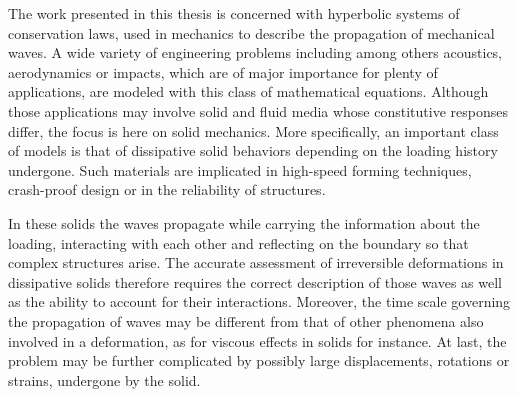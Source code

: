 The work presented in this thesis is concerned with hyperbolic systems of conservation laws, used in mechanics to describe the propagation of mechanical waves.
A wide variety of engineering problems including among others acoustics, aerodynamics or impacts, which are of major importance for plenty of applications, are modeled with this class of mathematical equations. 
Although those applications may involve solid and fluid media whose constitutive responses differ, the focus is here on solid mechanics.
More specifically, an important class of models is that of dissipative solid behaviors depending on the loading history undergone.
Such materials are implicated in high-speed forming techniques, crash-proof design or in the reliability of structures.

In these solids the waves propagate while carrying the information about the loading, interacting with each other and reflecting on the boundary so that complex structures arise.
The accurate assessment of irreversible deformations in dissipative solids therefore requires the correct description of those waves as well as the ability to account for their interactions.
Moreover, the time scale governing the propagation of waves may be different from that of other phenomena also involved in a deformation, as for viscous effects in solids for instance.
At last, the problem may be further complicated by possibly large displacements, rotations or strains, undergone by the solid.


